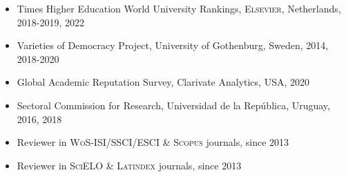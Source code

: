 





\begin{publications}

\begin{itemize}
\item{\small Times Higher Education World University Rankings, {\scshape Elsevier}, 
Netherlands, 2018-2019, 2022}
\item{\small Varieties of Democracy Project, University of Gothenburg, Sweden, 2014, 2018-2020}
\item{\small Global Academic Reputation Survey, Clarivate Analytics, USA, 2020}
\item{\small Sectoral Commission for Research, Universidad de la Rep\'ublica, Uruguay, 2016, 2018}
\item{\small Reviewer in {\scshape WoS-ISI/SSCI/ESCI} \& {\scshape Scopus} journals, since 2013}
\item{\small Reviewer in {\scshape SciELO} \& {\scshape Latindex} journals, since 2013}
\end{itemize}

\vspace{1mm}
\end{publications}
